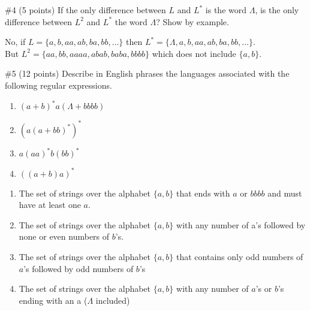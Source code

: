 \begin{problem}{\#4 (5 points)}
    If the only difference between \(L\) and \(L^*\) is the word \(\Lambda\), is the only difference between \(L^2\) and \(L^*\) the word \(\Lambda\)?
    Show by example.
\end{problem}
\vspace{2em}
\begin{solution}
    No, if \(L=\{a,b,aa,ab,ba,bb,\ldots\}\) then \(L^*=\{\Lambda,a,b,aa,ab,ba,bb,\ldots\}\).\\
    But \(L^2=\{aa,bb,aaaa,abab,baba,bbbb\}\) which does not include \(\{a,b\}\).
\end{solution}

\begin{problem}{\#5 (12 points)}
    Describe in English phrases the languages associated with the following regular expressions.
    \begin{enumerate}[label=\alph*]
        \item \((a+b)^*a(\Lambda+bbbb)\)
        \item \((a(a+bb)^*)^*\)
        \item \(a(aa)^*b(bb)^*\)
        \item \(((a+b)a)^*\)
    \end{enumerate}
\end{problem}
\vspace{2em}
\begin{solution}
    \begin{enumerate}[label=\alph*]
        \item The set of strings over the alphabet \(\{a,b\}\) that ends with \(a\) or \(bbbb\) and must have at least one \(a\).
        \item The set of strings over the alphabet \(\{a,b\}\) with any number of a's followed by none or even numbers of \(b\)'s.
        \item The set of strings over the alphabet \(\{a,b\}\) that contains only odd numbers of \(a\)'s followed by odd numbers of \(b\)'s
        \item The set of strings over the alphabet \(\{a,b\}\) with any number of \(a\)'s or \(b\)'s ending with an a ($\Lambda$ included)
    \end{enumerate}
\end{solution}